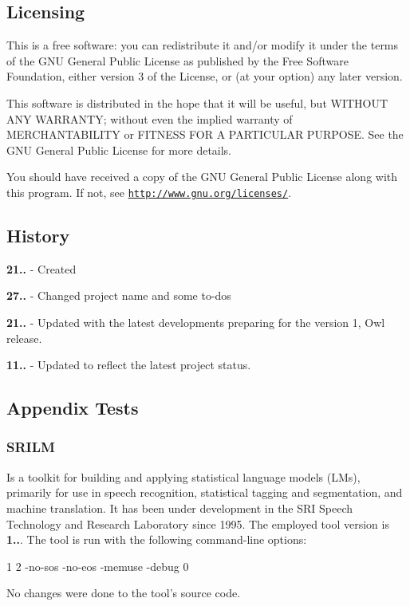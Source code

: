\subsection*{Licensing}

This is a free software\+: you can redistribute it and/or modify it under the terms of the G\+N\+U General Public License as published by the Free Software Foundation, either version 3 of the License, or (at your option) any later version.

This software is distributed in the hope that it will be useful, but W\+I\+T\+H\+O\+U\+T A\+N\+Y W\+A\+R\+R\+A\+N\+T\+Y; without even the implied warranty of M\+E\+R\+C\+H\+A\+N\+T\+A\+B\+I\+L\+I\+T\+Y or F\+I\+T\+N\+E\+S\+S F\+O\+R A P\+A\+R\+T\+I\+C\+U\+L\+A\+R P\+U\+R\+P\+O\+S\+E. See the G\+N\+U General Public License for more details.

You should have received a copy of the G\+N\+U General Public License along with this program. If not, see \href{http://www.gnu.org/licenses/}{\tt http\+://www.\+gnu.\+org/licenses/}.

\subsection*{History}


\begin{DoxyItemize}
\item {\bfseries 21..} -\/ Created
\item {\bfseries 27..} -\/ Changed project name and some to-\/do\textquotesingle{}s
\item {\bfseries 21..} -\/ Updated with the latest developments preparing for the version 1, Owl release.
\item {\bfseries 11..} -\/ Updated to reflect the latest project status.
\end{DoxyItemize}

\subsection*{Appendix Tests}

\subsubsection*{S\+R\+I\+L\+M}

Is a toolkit for building and applying statistical language models (L\+Ms), primarily for use in speech recognition, statistical tagging and segmentation, and machine translation. It has been under development in the S\+R\+I Speech Technology and Research Laboratory since 1995. The employed tool version is {\bfseries 1..}. The tool is run with the following command-\/line options\+: 
\begin{DoxyCode}
1 %
2       -no-sos -no-eos -memuse -debug 0
\end{DoxyCode}
 No changes were done to the tool’s source code.

